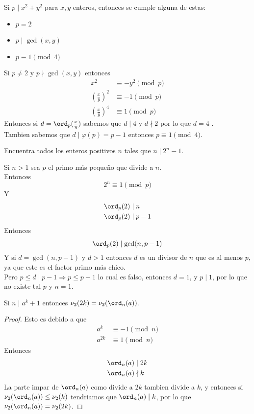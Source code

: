 \documentclass[11pt]{scrartcl}
\begin{document}
\begin{example}
    Si $p \mid x^2+y^2$ para $x,y$ enteros, entonces se cumple alguna de estas: 
    \begin{itemize}
        \item $p=2$
        \item $p \mid \gcd (x,y)$
        \item $p \equiv 1 \pmod 4$
    \end{itemize}
\end{example}

\begin{soln}
Si $p \neq 2$ y $p \nmid \gcd (x,y)$ entonces 
\begin{align*}
    x^2 &\equiv -y^2 \pmod p \\
    \left(\frac xy\right)^2 &\equiv -1 \pmod p \\ 
    \left(\frac xy\right)^4 &\equiv 1 \pmod p 
\end{align*}
Entonces si $d= \ord_p(\frac xy)$ sabemos que $d \mid 4$ y $d\nmid 2$ por lo que $d = 4$ .\\
Tambien sabemos que $d \mid \varphi(p)= p-1$ entonces $p \equiv 1 \pmod 4$.
\end{soln}

\begin{example}
Encuentra todos los enteros positivos $n$ tales que $n \mid 2^n-1$.
\end{example}

\begin{soln}
Si $n>1$ sea $p$ el primo más pequeño que divide a $n$.  \\
Entonces 
\[2^n \equiv 1 \pmod p \]
Y 
\begin{align*}
    \ord_p (2) &\mid n \\
    \ord_p (2) &\mid p-1 
\end{align*}
Entonces 
\[\ord_p(2) \mid \gcd (n, p-1)\]
Y si $d= \gcd (n, p-1)$ y $d>1$ entonces $d$ es un divisor de $n$ que es al menos $p$, ya que este es el factor primo más chico. \\
Pero $ p \leq d \mid p-1 \Rightarrow p \leq p-1$ lo cual es falso, entonces $d=1$, y $p \mid 1$, por lo que no existe tal $p$ y $n=1$.
\end{soln}

\begin{theorem}
    Si $n \mid a^k+1$ entonces $\nu_2(2k)=\nu_2(\ord_n(a))$.
\end{theorem}
\begin{proof}
Esto es debido a que 
\begin{align*}
    a^k &\equiv -1 \pmod n \\
    a^{2k} &\equiv 1 \pmod n
\end{align*}
Entonces 
\begin{align*}
    \ord_n(a) &\mid 2k \\
    \ord_n(a) &\nmid k
\end{align*}
La parte impar de $\ord_n(a)$ como divide a $2k$ tambien divide a $k$, y entonces si $\nu_2(\ord_n(a)) \leq \nu_2(k)$ tendriamos que $\ord_n(a) \mid k$, por lo que $\nu_2(\ord_n(a))= \nu_2(2k)$.
\end{proof}
\end{document}
